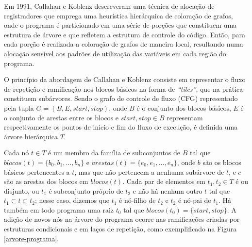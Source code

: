 \documentclass[
	12pt,				%
	openright,			%
	twoside,			%
	a4paper,			%
	tcc,			%
	]{ABNT-DC-UEL}
\begin{document}
Em 1991, Callahan e Koblenz \cite{callahan:91} descreveram uma técnica de alocação de registradores que emprega uma heurística hierárquica de coloração de grafos, onde o programa é particionado em uma série de porções que constituem uma estrutura de árvore e que refletem a estrutura de controle do código. Então, para cada porção é realizada a coloração de grafos de maneira local, resultando numa alocação sensível aos padrões de utilização das variáveis em cada região do programa.

O princípio da abordagem de Callahan e Koblenz consiste em representar o fluxo de repetição e ramificação nos blocos básicos na forma de \textit{``tiles''}, que na prática constituem subárvores. Sendo o grafo de controle de fluxo (CFG) representado pela tupla $G = (B, E, \textit{start}, \textit{stop})$, onde $B$ é o conjunto dos blocos básicos, $E$ é o conjunto de arestas entre os blocos e $\mathit{start}, \textit{stop} \in B$ representam respectivamente os pontos de início e fim do fluxo de execução, é definida uma árvore hierárquica $T$.

Cada nó $t \in T$ é um membro da família de subconjuntos de $B$ tal que $\mathit{blocos}(t) = \{b_0, b_1, \dots, b_n\}$ e $\mathit{arestas}(t)=\{e_0, e_1, \dots, e_n\}$, onde $b$ são os blocos básicos pertencentes a $t$, mas que não pertencem a nenhuma subárvore de $t$, e $e$ são as arestas dos blocos em $\mathit{blocos}(t)$. Cada par de elementos em $t_1, t_2 \in T$ é ou disjunto, ou $t_1$ é subconjunto próprio de $t_2$ e não há nenhum outro $t$ tal que $t_1 \subset t \subset t_2$; nesse caso, dizemos que $t_1$ é nó-filho de $t_2$ e $t_2$ é nó-pai de $t_1$. Há também em todo programa uma raiz $t_0$ tal que $\mathit{blocos}(t_0) = \{\mathit{start}, \mathit{stop}\}$. A adição de novos nós na árvore do programa ocorre nas ramificações criadas por estruturas condicionais e em laços de repetição, como exemplificado na Figura \ref{arvore-programa}.
\end{document}
